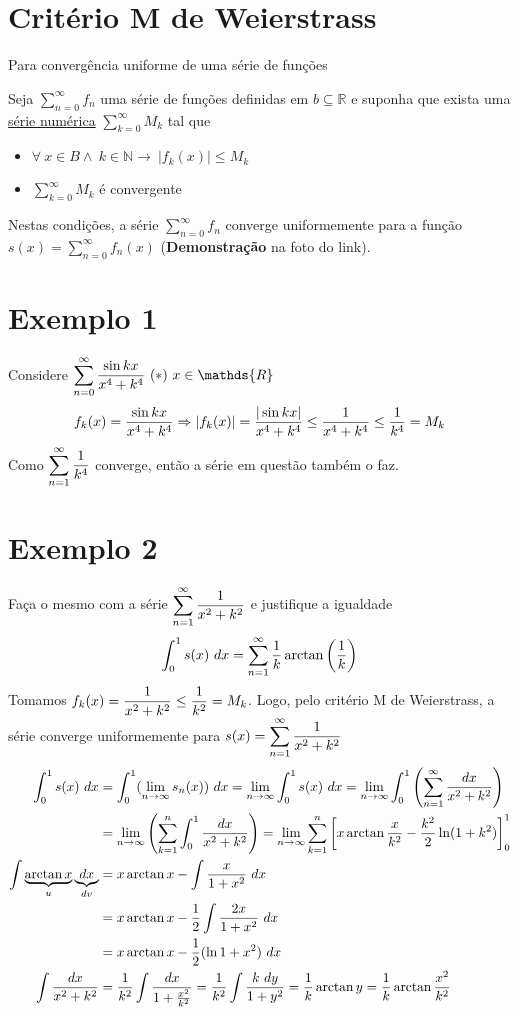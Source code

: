 \documentclass[12pt,openany]{book}
\newcommand{\LI}[1][n]{\lim_{{#1} \rightarrow \infty}}
\newcommand{\soma}[2][n]{\sum_{{#1} = #2}^\infty}
\begin{document}
\section{Critério M de Weierstrass} {Para convergência uniforme de uma série de funções}

Seja $\displaystyle{\soma{0} f_n}$ uma série de funções definidas em $b \subseteq \mathds{R}$ e suponha que exista uma \underline{série numérica} $\displaystyle{\soma[k]{0} M_k}$ tal que \begin{itemize}
\item $\forall \ x \in B \land \ k \in \mathds{N} \rightarrow \ |f_k(x)| \leq M_k$
\item $\displaystyle{\soma[k]{0} M_k}$ é convergente
\end{itemize}

Nestas condições, a série $\displaystyle{\soma{0} f_n}$ converge uniformemente para a função $\displaystyle{s(x) = \soma{0} f_n(x)}$ (\textbf{Demonstração} na foto do link).

\section*{Exemplo 1} {Considere $\displaystyle{\soma{0} {\sin kx \over x^4 + k^4} \ (*) \ x \in \mathds{R}}$}
$$f_k(x) = {\sin kx \over x^4 + k^4} \Rightarrow |f_k(x)| = {|\sin kx| \over x^4 + k^4} \leq {1 \over x^4 + k^4} \leq {1 \over k^4} = M_k$$ Como $\displaystyle{\soma{1} {1 \over k^4}}$ converge, então a série em questão também o faz.

\section*{Exemplo 2}{Faça o mesmo com a série $\displaystyle{\soma{1} {1 \over x^2 + k^2}}$ e justifique a igualdade $$\int_0^1 s(x) \ dx = \soma{1} {1 \over k} \arctan \left( {1 \over k} \right)$$} Tomamos $\displaystyle{f_k(x) = {1 \over x^2 + k^2} \leq {1 \over k^2} = M_k}$. Logo, pelo critério M de Weierstrass, a série converge uniformemente para $s(x) = \displaystyle{\soma{1} {1 \over x^2 + k^2}}$ \begin{align*}
\int_0^1 s(x) \ dx &= \int_0^1 (\LI s_n (x)) \ dx = \LI \int_0^1 s(x) \ dx = \LI \int_0^1 \left(\soma{1} {dx \over x^2 + k^2}\right) \\
&= \LI \left( \sum_{k=1}^n \int_0^1 {dx \over x^2 + k^2}\right) = \LI \sum_{k=1}^n \left[ x \arctan {x \over k^2} - {k^2 \over 2} \ln (1+k^2) \right]_0^1\\
\int \underbrace{\arctan x}_{u} \underbrace{dx}_{dv} &= x \arctan x - \int {x \over 1 + x^2} \ dx \\
&= x \arctan x - {1 \over 2} \int {2x \over 1 + x^2} \ dx \\
&= x \arctan x - {1 \over 2} (\ln{1 + x^2}) \ dx \\
\int {dx \over x^2 + k^2} &= {1 \over k^2} \int \frac{dx}{1 + \frac{x^2}{k^2}} = {1 \over k^2} \int \frac{k \ dy}{1 + y^2} = \frac{1}{k} \arctan{y} = \frac{1}{k} \arctan{\frac{x^2}{k^2}}
\end{align*}
\end{document}
